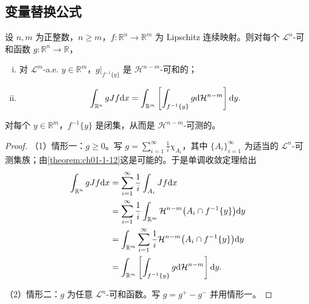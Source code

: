 \documentclass[../../main.tex]{subfiles}%
\begin{document}
\subsection{变量替换公式}\label{subsection:ch03-04-3}

\begin{theorem}[水平集上的积分]\label{theorem:ch03-3-11}
设 $n,m$ 为正整数，$n\geqslant m$，$f:\mathbb{R}^n\to\mathbb{R}^m$ 为 Lipschitz 连续映射。则对每个 $\mathcal{L}^n$-可和函数 $g:\mathbb{R}^n\to\mathbb{R}$，
\begin{enumerate}[(i)]
\item 对 $\mathcal{L}^m$-a.e. $y\in\mathbb{R}^m$，$g|_{f^{-1}\{y\}}$ 是 $\mathcal{H}^{n-m}$-可和的；
\item \begin{align*}
\int_{\mathbb{R}^n}gJf\mathrm{d} x=\int_{\mathbb{R}^m}\left[\int_{f^{-1}\{y\}}g\mathrm{d}\mathcal{H}^{n-m}\right]\mathrm{d} y.
\end{align*}
\end{enumerate}
\end{theorem}

\begin{remark}\label{remark:ch03-thm-3-11-水平集}
对每个 $y\in\mathbb{R}^m$，$f^{-1}\{y\}$ 是闭集，从而是 $\mathcal{H}^{n-m}$-可测的。
\end{remark}

\begin{proof}
（1）情形一：$g\geqslant0$。写 $g=\sum_{i=1}^{\infty}\frac{1}{i}\chi_{A_i}$，其中 $\{A_i\}_{i=1}^{\infty}$ 为适当的 $\mathcal{L}^n$-可测集族；由\cref{theorem:ch01-1-12}这是可能的。于是单调收敛定理给出%
\begin{align*}
\int_{\mathbb{R}^n}gJf\mathrm{d} x&=\sum_{i=1}^{\infty}\frac{1}{i}\int_{A_i}Jf\mathrm{d} x\\
&=\sum_{i=1}^{\infty}\frac{1}{i}\int_{\mathbb{R}^m}\mathcal{H}^{n-m}\bigl(A_i\cap f^{-1}\{y\}\bigr)\mathrm{d} y\\
&=\int_{\mathbb{R}^m}\sum_{i=1}^{\infty}\frac{1}{i}\mathcal{H}^{n-m}\bigl(A_i\cap f^{-1}\{y\}\bigr)\mathrm{d} y\\
&=\int_{\mathbb{R}^m}\left[\int_{f^{-1}\{y\}}g\mathrm{d}\mathcal{H}^{n-m}\right]\mathrm{d} y.
\end{align*}

（2）情形二：$g$ 为任意 $\mathcal{L}^n$-可和函数。写 $g=g^+-g^-$ 并用情形一。
\end{proof}
\end{document}
